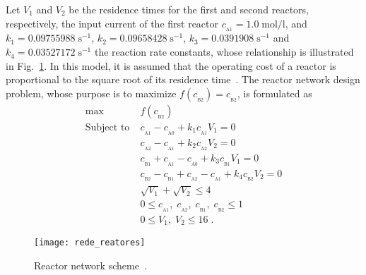 \documentclass[final,5p,times,twocolumn,numbers]{elsarticle}
\begin{document}
Let $ V_{1} $ and $ V_{2} $ be the residence times for the first and second reactors, respectively, the input current of the first reactor $ c_{_{\mathrm{A} 1}} = 1.0 \; \textrm{mol/l} $, and $ k_{1} = 0.09755988 \; \mathrm{s}^{-1} $, $ k_{2} = 0.09658428 \; \mathrm{s}^{-1} $, $ k_{3} = 0.0391908 \; \mathrm{s}^{-1} $ and $ k_{4} = 0.03527172 \; \mathrm{s}^{-1} $ the reaction rate constants, whose relationship is illustrated in Fig.~\ref{fig:rede_reatores}. In this model, it is assumed that the operating cost of a reactor is proportional to the square root of its residence time~\cite{bib:smith1996}. The reactor network design problem, whose purpose is to maximize $ f\left( c_{_{\mathrm{B} 2}} \right) = c_{_{\mathrm{B} 2}} $, is formulated as
%
\begin{equation} \label{eq:prob_rede_reatores_det}
\begin{split}
\max \; &f\left( c_{_{\mathrm{B} 2}} \right)\\
\textrm{Subject to} \; &c_{_{\mathrm{A} 1}} - c_{_{\mathrm{A} 0}} + k_{1} c_{_{\mathrm{A} 1}} V_{1} = 0\\
\phantom{Subject to} \; &c_{_{\mathrm{A} 2}} - c_{_{\mathrm{A} 1}} + k_{2} c_{_{\mathrm{A} 2}} V_{2} = 0\\
\phantom{Subject to} \; &c_{_{\mathrm{B} 1}} + c_{_{\mathrm{A} 1}} - c_{_{\mathrm{A} 0}} + k_{3} c_{_{\mathrm{B} 1}} V_{1} = 0\\
\phantom{Subject to} \; &c_{_{\mathrm{B} 2}} - c_{_{\mathrm{B} 1}} + c_{_{\mathrm{A} 2}} - c_{_{\mathrm{A} 1}} + k_{4} c_{_{\mathrm{B} 2}} V_{2} = 0\\
\phantom{Subject to} \; &\sqrt{V_{1}} + \sqrt{V_{2}} \leq 4\\
\phantom{Subject to} \; &0 \leq c_{_{\mathrm{A} 1}}, \; c_{_{\mathrm{A} 2}}, \; c_{_{\mathrm{B} 1}}, \; c_{_{\mathrm{B} 2}} \leq 1\\
\phantom{Subject to} \; &0 \leq V_{1}, \; V_{2} \leq 16 \; .
\end{split}
\end{equation}

\begin{figure}[!ht]
    \centering
    \texttt{[image: rede\_reatores]}
    \caption{Reactor network scheme~\cite{bib:smith1996}.}
    \label{fig:rede_reatores}
\end{figure}
\end{document}
